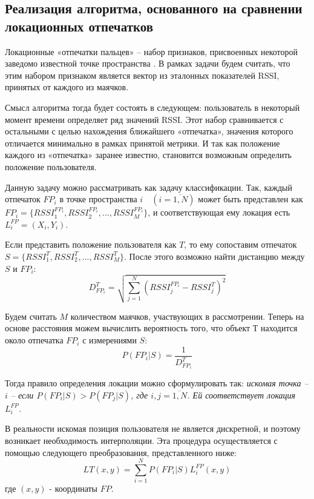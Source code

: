 \subsection{Реализация алгоритма, основанного на сравнении локационных отпечатков}

Локационные «отпечатки пальцев» – набор признаков, присвоенных некоторой заведомо известной точке пространства \cite{elbes2013precise}.  В рамках задачи будем считать, что этим набором признаком является вектор из эталонных показателей RSSI, принятых от каждого из маячков.

Смысл алгоритма тогда будет состоять в следующем: пользователь в некоторый момент времени определяет ряд значений RSSI. Этот набор сравнивается с остальными с целью нахождения ближайшего «отпечатка», значения которого отличается минимально в рамках принятой метрики. И так как положение каждого из «отпечатка» заранее известно, становится возможным определить положение пользователя.

Данную задачу можно рассматривать как задачу классификации. Так, каждый отпечаток $FP_i$ в точке пространства $i \quad (i=\overline{1,N})$ может быть представлен как $FP_i = \{ RSSI_1^{FP_i}, RSSI_2^{FP_i}, ..., RSSI_M^{FP_i} \}$, и соответствующая ему локация есть $L_i^{FP} = (X_i, Y_i)$.

Если представить положение пользователя как $T$, то ему сопоставим отпечаток $ S = \{ RSSI_1^T, RSSI_2^T, ..., RSSI_M^T \}$. После этого возможно найти дистанцию между $S$ и $FP_i$:
\begin{equation} \label{for:D}
    D^T_{FP_i} = \sqrt{ \sum_{j=1}^N ( RSSI_j^{FP_i} - RSSI_j^T )^2 }
\end{equation}

Будем считать $M$ количеством маячков, участвующих в рассмотрении. Теперь на основе расстояния можем вычислить вероятность того, что объект $Т$ находится около отпечатка $FP_i$ с измерениями $S$:
\begin{equation} \label{for:Prob}
    P(FP_i | S) = \frac{1}{ D^T_{FP_i} }
\end{equation}

Тогда правило определения локации можно сформулировать так: \textit{искомая точка – $i$ – если $P(FP_i | S) > P(FP_j | S)$, где $i,j = \overline{1,N}$. Ей соответствует локация $L_i^{FP}$.}

В реальности искомая позиция пользователя не является дискретной, и поэтому возникает необходимость интерполяции. Эта процедура осуществляется с помощью следующего преобразования, представленного ниже:
\[
    LT(x,y) = \sum_{i=1}^N P(FP_i | S) L_i^{FP}(x,y)
\]
где $(x,y)$ - координаты $FP$.

